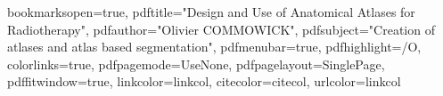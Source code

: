 
\hypersetup
{
bookmarksopen=true,
pdftitle="Design and Use of Anatomical Atlases for Radiotherapy",
pdfauthor="Olivier COMMOWICK", 
pdfsubject="Creation of atlases and atlas based segmentation", %
pdfmenubar=true, %
pdfhighlight=/O, %
colorlinks=true, %
pdfpagemode=UseNone, %
pdfpagelayout=SinglePage, %
pdffitwindow=true, %
linkcolor=linkcol, %
citecolor=citecol, %
urlcolor=linkcol %
}


\setcounter{secnumdepth}{3}
\setcounter{tocdepth}{2}


\def\argmax{\operatornamewithlimits{arg\,max}}
\def\argmin{\operatornamewithlimits{arg\,min}}
\def\diag{\operatorname{Diag}}
\newcommand{\eqRef}[1]{(\ref{#1})}

\usepackage{rotating}                    %
\usepackage{fancyhdr}                    %

  

\pagestyle{fancy}                       %
\fancyfoot{}                            %



